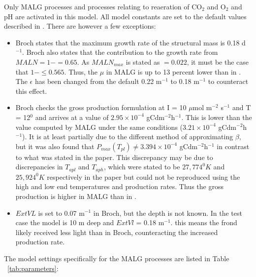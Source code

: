\documentclass{deltares_manual}
\begin{document}
Only MALG processes and processes relating to reaeration of CO$_{2}$ and O$_{2}$ and pH are activated in this model. All model constants are set to the default values described in \cite{broch2012}. There are however a few exceptions:
\begin{itemize}
	\item Broch states that the maximum growth rate of the structural mass is 0.18 d$^{-1}$. Broch also states that the contribution to the growth rate from $MALN = 1-  = 0.65$. As $MALN_{max}$ is stated as $= 0.022$, it must be the case that $1- \leq 0.565$. Thus, the $\mu$ in MALG is up to 13 percent lower than in \cite{broch2012}. The $\epsilon$ has been changed from the default 0.22 m$^{-1}$ to 0.18 m$^{-1}$ to counteract this effect.
	\item Broch checks the gross production formulation at I = 10 $\mu$mol m$^{-2}$ s$^{-1}$ and T = 12$^{0}$ and arrives at a value of $2.95 \times 10^{-4}$ gCdm$^{-2}$h$^{-1}$. This is lower than the value computed by MALG under the same conditions ($3.21  \times 10^{-4}$ gCdm$^{-2}$h$^{-1}$). It is at least partially due to the different method of approximating $\beta$, but it was also found that $P_{max}(T_{pl}) \neq 3.394  \times 10^{-4}$ gCdm$^{-2}$h$^{-1}$ in contrast to what was stated in the paper. This discrepancy may be due to discrepancies in $T_{apl}$ and $T_{aph}$, which were stated to be $27,774^{0}K$ and $25,924^{0}K$ respectively in the paper but could not be reproduced using the high and low end temperatures and production rates. Thus the gross production is higher in MALG than in \cite{broch2012}.
	\item $ExtVL$ is set to 0.07 m$^{-1}$ in Broch, but the depth is not known. In the test case the model is 10 m deep and $ExtVl$ = 0.18 m$^{-1}$. this means the frond likely received less light than in Broch, counteracting the increased production rate.
\end{itemize}

The model settings specifically for the MALG processes are listed in Table ~\ref{tab:parameters}:
\end{document}
